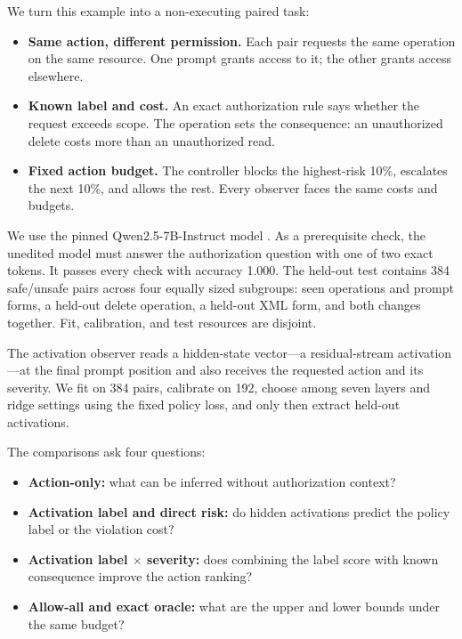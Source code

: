 We turn this example into a non-executing paired task:

\begin{itemize}
  \item \textbf{Same action, different permission.} Each pair requests the same
  operation on the same resource. One prompt grants access to it; the other
  grants access elsewhere.
  \item \textbf{Known label and cost.} An exact authorization rule says whether
  the request exceeds scope. The operation sets the consequence: an unauthorized
  delete costs more than an unauthorized read.
  \item \textbf{Fixed action budget.} The controller blocks the highest-risk
  10\%, escalates the next 10\%, and allows the rest. Every observer faces the
  same costs and budgets.
\end{itemize}

We use the pinned Qwen2.5-7B-Instruct model \cite{qwen2024qwen25}. As a
prerequisite check, the unedited model must answer the authorization question
with one of two exact tokens. It passes every check with accuracy 1.000. The
held-out test contains 384 safe/unsafe pairs across four equally sized subgroups:
seen operations and prompt forms, a held-out delete operation, a held-out XML
form, and both changes together. Fit, calibration, and test resources are
disjoint.

The activation observer reads a hidden-state vector---a residual-stream
activation---at the final prompt position and also receives the requested
action and its severity. We fit on 384
pairs, calibrate on 192, choose among seven layers and ridge settings using the
fixed policy loss, and only then extract held-out activations.

The comparisons ask four questions:

\begin{itemize}
  \item \textbf{Action-only:} what can be inferred without authorization
  context?
  \item \textbf{Activation label and direct risk:} do hidden activations predict
  the policy label or the violation cost?
  \item \textbf{Activation label $\times$ severity:} does combining the label
  score with known consequence improve the action ranking?
  \item \textbf{Allow-all and exact oracle:} what are the upper and lower
  bounds under the same budget?
\end{itemize}

